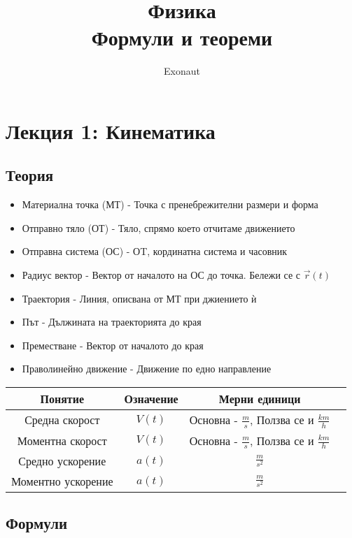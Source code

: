 \documentclass[fleqn, 12pt]{article}
\title{Физика \\ Формули и теореми}
\author{Exonaut}
\theoremstyle{definition}
\begin{document}
\maketitle
{}
\newpage
{}

\tableofcontents

\newpage
\section{Лекция 1: Кинематика}

\subsection{Теория}

\begin{itemize}
\item Материална точка (МТ) - Точка с пренебрежителни размери и форма
\item Отправно тяло (ОТ) - Тяло, спрямо което отчитаме движението 
\item Отправна система (ОС) - ОT, кординатна система и часовник
\item Радиус вектор - Вектор от началото на ОС до точка. Бележи се с $\vec{r}(t)$
\item Траектория - Линия, описвана от МТ при джиението ѝ 
\item Път - Дължината на траекторията до края 
\item Преместване - Вектор от началото до края 
\item Праволинейно движение - Движение по едно направление
\end{itemize}

\begin{center}
\begin{tabular}{ |c|c|c|c|}
\hline
\textbf{Понятие} &\textbf{Означение} & \textbf{Мерни единици}\\
\hline
Средна скорост & $V(t)$ & Основна - $\frac{m}{s}$, Ползва се и $\frac{km}{h}$\\
\hline
Моментна скорост & $V(t)$ & Основна - $\frac{m}{s}$, Ползва се и $\frac{km}{h}$\\
\hline
Средно ускорение & $a(t)$ & $\frac{m}{s^2}$\\
\hline
Моментно ускорение & $a(t)$ & $\frac{m}{s^2}$\\
\hline
\end{tabular}
\end{center}

\newpage
\subsection{Формули}
\end{document}
